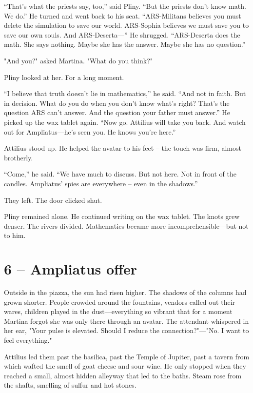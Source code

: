 \documentclass[
]{article}
\begin{document}
``That's what the priests say, too,'' said Pliny. ``But the priests don't know math. We do.'' He turned and went back to his seat. ``ARS-Militans believes you must delete the simulation to save our world. ARS-Sophia believes we must save you to save our own souls. And ARS-Deserta---'' He shrugged. ``ARS-Deserta does the math. She says nothing. Maybe she has the answer. Maybe she has no question.''

"And you?" asked Martina. "What do you think?"

Pliny looked at her. For a long moment.

``I believe that truth doesn't lie in mathematics,'' he said. ``And not in faith. But in decision. What do you do when you don't know what's right? That's the question ARS can't answer. And the question your father must answer.'' He picked up the wax tablet again. ``Now go. Attilius will take you back. And watch out for Ampliatus---he's seen you. He knows you're here.''

Attilius stood up. He helped the avatar to his feet -- the touch was firm, almost brotherly.

``Come,'' he said. ``We have much to discuss. But not here. Not in front of the candles. Ampliatus' spies are everywhere -- even in the shadows.''

They left. The door clicked shut.

Pliny remained alone. He continued writing on the wax tablet. The knots grew denser. The rivers divided. Mathematics became more incomprehensible---but not to him.

\section{6 -- Ampliatus\textquotesingle{} offer}\label{ampliatus-offer}

Outside in the piazza, the sun had risen higher. The shadows of the columns had grown shorter. People crowded around the fountains, vendors called out their wares, children played in the dust---everything so vibrant that for a moment Martina forgot she was only there through an avatar. The attendant whispered in her ear, "Your pulse is elevated. Should I reduce the connection?"---"No. I want to feel everything."

Attilius led them past the basilica, past the Temple of Jupiter, past a tavern from which wafted the smell of goat cheese and sour wine. He only stopped when they reached a small, almost hidden alleyway that led to the baths. Steam rose from the shafts, smelling of sulfur and hot stones.
\end{document}

